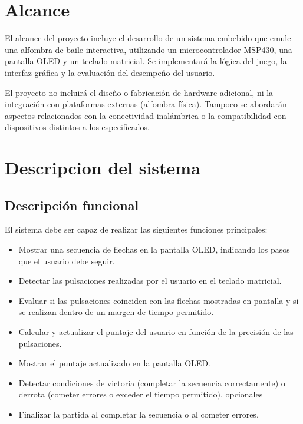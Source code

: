 \documentclass[a4paper,12pt]{article}
\begin{document}
\begin{linenumbers}
  \section{Alcance}
  \label{sec:Alcance}

  El alcance del proyecto incluye el desarrollo de un sistema embebido que emule una alfombra de baile interactiva, utilizando un microcontrolador MSP430, una pantalla OLED y un teclado matricial. Se implementará la lógica del juego, la interfaz gráfica y la evaluación del desempeño del usuario. 

  El proyecto no incluirá el diseño o fabricación de hardware adicional, ni la integración con plataformas externas (alfombra física). Tampoco se abordarán aspectos relacionados con la conectividad inalámbrica o la compatibilidad con dispositivos distintos a los especificados.

  \section{Descripcion del sistema}
  \label{sec:Descripcion del sistema}
      \subsection{Descripción funcional}
      \label{sec:Descripción funcional} 
      El sistema debe ser capaz de realizar las siguientes funciones principales:

      \begin{itemize}
        \item Mostrar una secuencia de flechas en la pantalla OLED, indicando los pasos que el usuario debe seguir.
        \item Detectar las pulsaciones realizadas por el usuario en el teclado matricial.
        \item Evaluar si las pulsaciones coinciden con las flechas mostradas en pantalla y si se realizan dentro de un margen de tiempo permitido.
        \item Calcular y actualizar el puntaje del usuario en función de la precisión de las pulsaciones.
        \item Mostrar el puntaje actualizado en la pantalla OLED.
        \item Detectar condiciones de victoria (completar la secuencia correctamente) o derrota (cometer errores o exceder el tiempo permitido).
opcionales        
        \item Finalizar la partida al completar la secuencia o al cometer errores.
      \end{itemize}

\end{linenumbers}
\end{document}
